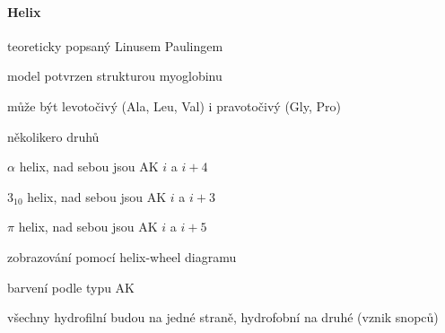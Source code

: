 \documentclass[DIV=8]{scrreprt}
\begin{document}
\paragraph{Helix}
\begin{myItemize}[nosep]
    \item teoreticky popsaný Linusem Paulingem
    \item model potvrzen strukturou myoglobinu
    \item může být levotočivý (Ala, Leu, Val) i pravotočivý (Gly, Pro)
    \item několikero druhů
\begin{myItemize}[nosep]
    \item \(\alpha\) helix, nad sebou jsou AK \(i\) a \(i + 4\)
    \item \(3_{10}\) helix, nad sebou jsou AK \(i\) a \(i + 3\)
    \item \(\pi\) helix, nad sebou jsou AK \(i\) a \(i + 5\)
\end{myItemize}

    \item zobrazování pomocí helix-wheel diagramu
\begin{myItemize}[nosep]
    \item barvení podle typu AK
    \item všechny hydrofilní budou na jedné straně, hydrofobní na druhé (vznik snopců)
\end{myItemize}

\end{myItemize}
\end{document}
